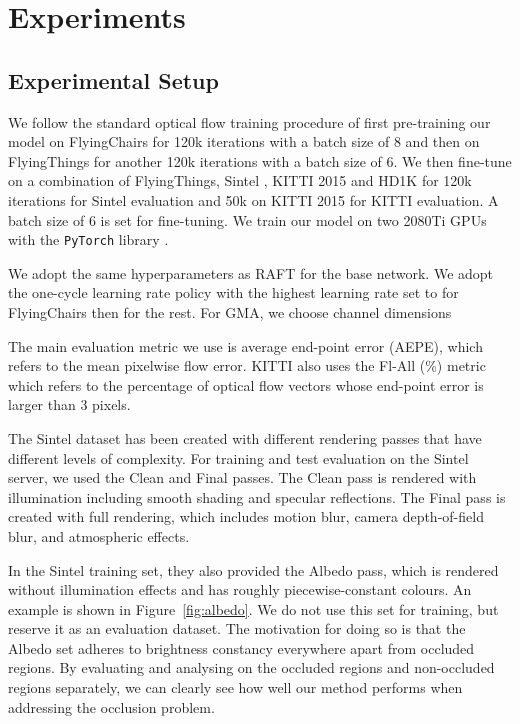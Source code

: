 \documentclass[10pt,twocolumn,letterpaper]{article}
\begin{document}
\section{Experiments}
\label{Sec:experiments}
\subsection{Experimental Setup}
\label{Sec:details}

We follow the standard optical flow training procedure \cite{flownet2,pwcnet,raft}
of first pre-training our model on FlyingChairs
\cite{flownet} for 120k iterations with a batch size of 8 and then on FlyingThings
\cite{things} for another 120k iterations with a batch size of 6. We then fine-tune on
a combination of FlyingThings, Sintel \cite{sintel}, KITTI 2015 \cite{kitti} and HD1K \cite{hd1k} 
for 120k iterations for Sintel evaluation and 50k on KITTI 2015 \cite{kitti} for KITTI evaluation. 
A batch size of 6 is set for fine-tuning. We train our model on two 2080Ti GPUs with the 
\texttt{PyTorch} library \cite{pytorch}.

We adopt the same hyperparameters as RAFT \cite{raft} for the base network. 
We adopt the one-cycle learning rate policy \cite{onecycle} with the highest learning rate
set to  for FlyingChairs then  for the rest. 
For GMA, we choose channel dimensions 

The main evaluation metric we use is average end-point error (AEPE), which refers to the mean
pixelwise flow error. KITTI also uses the Fl-All (\%) metric which refers to the percentage
of optical flow vectors whose end-point error is larger than 3 pixels. 

The Sintel dataset has been created with different rendering passes that have different levels of complexity.
For training and test evaluation on the Sintel server, we used the Clean and Final passes.
The Clean pass is rendered with illumination including smooth shading and specular reflections. The Final pass 
is created with full rendering, which includes motion blur, camera depth-of-field blur, and atmospheric effects. 

In the Sintel training set, they also provided the Albedo pass, which is rendered without illumination effects
and has roughly piecewise-constant colours. An example is shown in Figure~\ref{fig:albedo}. 
We do not use this set for training, but reserve it as an evaluation dataset.
The motivation for doing so is that the Albedo set adheres to brightness constancy everywhere 
apart from occluded regions. 
By evaluating and analysing on the occluded regions and non-occluded regions separately, 
we can clearly see how well our method performs when addressing the occlusion problem. 
\end{document}
